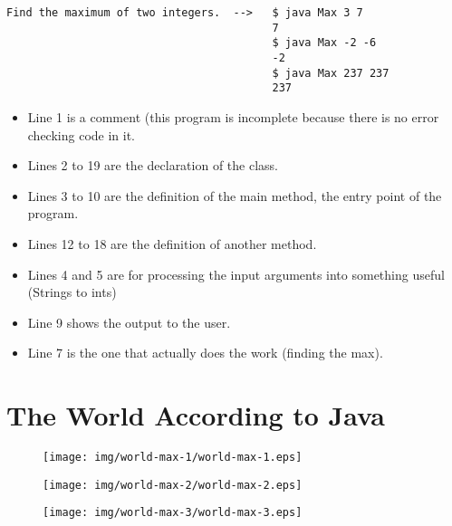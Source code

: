 \documentclass[8pt, a4paper, oneside]{extarticle}
\begin{document}
\begin{Verbatim}
Find the maximum of two integers.  -->   $ java Max 3 7
                                         7
                                         $ java Max -2 -6
                                         -2
                                         $ java Max 237 237
                                         237
\end{Verbatim}
\newpage
\begin{multicols}{2}
\columnbreak

\begin{itemize}

  \item Line 1 is a comment (this program is incomplete because there is no
    error checking code in it.

  \item Lines 2 to 19 are the declaration of the class.

  \item Lines 3 to 10 are the definition of the main method, the entry point of
    the program.

  \item Lines 12 to 18 are the definition of another method.

  \item Lines 4 and 5 are for processing the input arguments into something
    useful (Strings to ints)

  \item Line 9 shows the output to the user.

  \item Line 7 is the one that actually does the work (finding the max).

\end{itemize}

\end{multicols}

\section{The World According to Java}

\begin{figure}[!ht]
  \centering
  \texttt{[image: img/world-max-1/world-max-1.eps]}
\end{figure}
\begin{figure}[!ht]
  \centering
  \begin{minipage}{.5\textwidth}
    \centering
    \texttt{[image: img/world-max-2/world-max-2.eps]}
  \end{minipage}%
  \begin{minipage}{.5\textwidth}
    \centering
    \texttt{[image: img/world-max-3/world-max-3.eps]}
  \end{minipage}
\end{figure}
\end{document}
